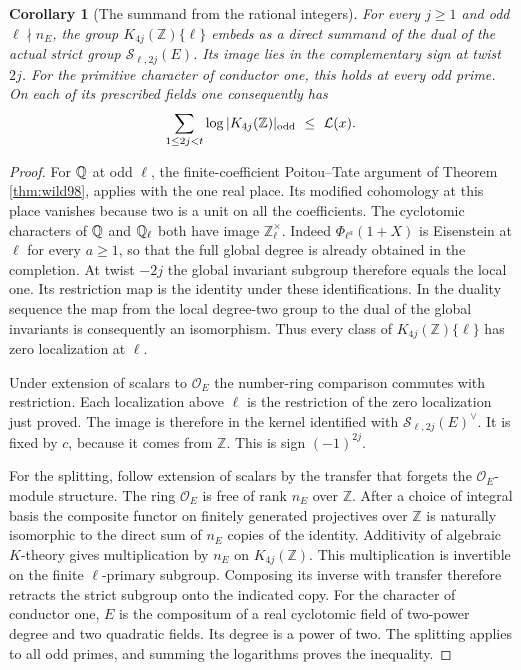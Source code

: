 \documentclass[a4paper,11pt]{article}
\newtheorem{corollary}[proposition]{Corollary}
\theoremstyle{definition}
\theoremstyle{remark}
\newcommand{\ZZ}{\mathbb Z}\newcommand{\ord}{\operatorname{ord}}
\numberwithin{equation}{section}
\begin{document}
\begin{corollary}[The summand from the rational integers]
\label{cor:transfer100}
For every \(j\ge1\) and odd \(\ell\nmid n_E\), the group
\(K_{4j}(\ZZ)\{\ell\}\) embeds as a direct summand of the dual of
the actual strict group \(\mathcal S_{\ell,2j}(E)\).
Its image lies in the complementary sign at twist \(2j\).
For the primitive character of conductor one, this holds at every
odd prime. On each of its prescribed fields one consequently has
\[
          \sum_{1\le 2j<t}\log |K_{4j}(\ZZ)|_{\rm odd}
                                      \ \le\ \mathcal L(x).
\]
\end{corollary}
\begin{proof}
For \(\mathbb Q\) at odd \(\ell\), the finite-coefficient Poitou--Tate
argument of Theorem \ref{thm:wild98}, applies with the one real place.
Its modified cohomology at this place vanishes because two is a
unit on all the coefficients. The cyclotomic characters of
\(\mathbb Q\) and \(\mathbb Q_\ell\) both have image \(\ZZ_\ell^\times\).
Indeed \(\Phi_{\ell^a}(1+X)\) is Eisenstein at \(\ell\) for every
\(a\ge1\), so that the full global degree is already obtained in
the completion. At twist \(-2j\) the global invariant subgroup
therefore equals the local one. Its restriction map is the
identity under these identifications. In the duality sequence the
map from the local degree-two group to the dual of the global
invariants is consequently an isomorphism. Thus every class of
\(K_{4j}(\ZZ)\{\ell\}\) has zero localization at \(\ell\).

Under extension of scalars to \(\mathcal O_E\) the number-ring
comparison commutes with restriction. Each localization above
\(\ell\) is the restriction of the zero localization just proved.
The image is therefore in the kernel identified with
\(\mathcal S_{\ell,2j}(E)^\vee\). It is fixed by \(c\), because
it comes from \(\ZZ\). This is sign \((-1)^{2j}\).

For the splitting, follow extension of scalars by the transfer that
forgets the \(\mathcal O_E\)-module structure. The ring
\(\mathcal O_E\) is free of rank \(n_E\) over \(\ZZ\). After a
choice of integral basis the composite functor on finitely
generated projectives over \(\ZZ\) is naturally isomorphic to
the direct sum of \(n_E\) copies of the identity. Additivity of
algebraic \(K\)-theory gives multiplication by \(n_E\) on
\(K_{4j}(\ZZ)\). This multiplication is invertible on the finite
\(\ell\)-primary subgroup. Composing its inverse with transfer
therefore retracts the strict subgroup onto the indicated copy.
For the character of conductor one, \(E\) is the compositum of
a real cyclotomic field of two-power degree and two quadratic
fields. Its degree is a power of two. The splitting applies to all
odd primes, and summing the logarithms proves the inequality.
\end{proof}
\end{document}
